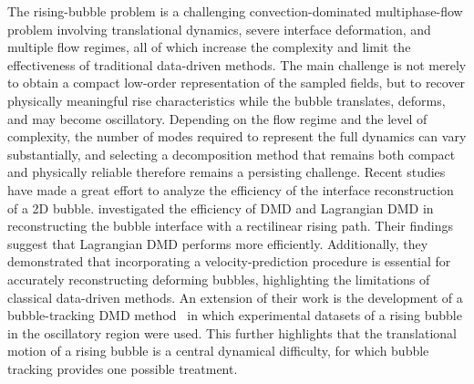 \documentclass[a4paper,fleqn]{cas-sc}
\begin{document}
	The rising-bubble problem is a challenging convection-dominated multiphase-flow problem involving translational dynamics, severe interface deformation, and multiple flow regimes, all of which increase the complexity and limit the effectiveness of traditional data-driven methods. The main challenge is not merely to obtain a compact low-order representation of the sampled fields, but to recover physically meaningful rise characteristics while the bubble translates, deforms, and may become oscillatory. Depending on the flow regime and the level of complexity, the number of modes required to represent the full dynamics can vary substantially, and selecting a decomposition method that remains both compact and physically reliable therefore remains a persisting challenge. Recent studies have made a great effort to analyze the efficiency of the interface reconstruction of a 2D bubble. \citet{Yin2023a} investigated the efficiency of DMD and Lagrangian DMD in reconstructing the bubble interface with a rectilinear rising path. Their findings suggest that Lagrangian DMD performs more efficiently. Additionally, they demonstrated that incorporating a velocity-prediction procedure is essential for accurately reconstructing deforming bubbles, highlighting the limitations of classical data-driven methods. An extension of their work is the development of a bubble-tracking DMD method~\cite{Yin2023} in which experimental datasets of a rising bubble in the oscillatory region were used. This further highlights that the translational motion of a rising bubble is a central dynamical difficulty, for which bubble tracking provides one possible treatment.
	
\end{document}
